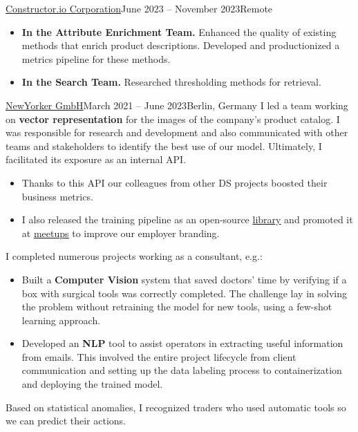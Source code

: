 
{\href{https://constructor.io/}{Constructor.io Corporation}}{June 2023 -- November 2023}{Remote}
\begin{itemize}
\item \textbf{In the Attribute Enrichment Team.} Enhanced the quality of existing methods that enrich product descriptions. Developed and productionized a metrics pipeline for these methods.
\item \textbf{In the Search Team.} Researched thresholding methods for retrieval.
\end{itemize}

\divider

{\href{https://www.newyorker.de/}{NewYorker GmbH}}{March 2021 -- June 2023}{Berlin, Germany}
I led a team working on \textbf{vector representation} for the images of the company's product catalog.
I was responsible for research and development and also
communicated with other teams and stakeholders to identify the best use of
our model. Ultimately, I facilitated its exposure as an internal API. 

\begin{itemize}
\item Thanks to this API our colleagues from other DS projects boosted their business metrics. 
\item I also released the training pipeline as an open-source \href{https://github.com/OML-Team/open-metric-learning}{\underline{library}} and promoted
it at 
\href{https://drive.google.com/drive/folders/1uHmLU8vMrMVMFodt36u0uXAgYjG_3D30?usp=share_link}{\underline{meetups}}
to improve our employer branding. 
\end{itemize}

\divider

I completed numerous projects working as a consultant, e.g.:
\begin{itemize}
\item Built a \textbf{Computer Vision} system that saved doctors' time by verifying if a box with surgical tools was correctly completed. The challenge lay in solving the problem without retraining the model for new tools, using a few-shot learning approach.
\item Developed an \textbf{NLP} tool to assist operators in extracting useful information from emails. This involved the entire project lifecycle from client communication and setting up the data labeling process to containerization and deploying the trained model.
\end{itemize}

\divider

Based on statistical anomalies, I recognized traders who used automatic tools so we can predict their actions.
\smallskip
\smallskip
